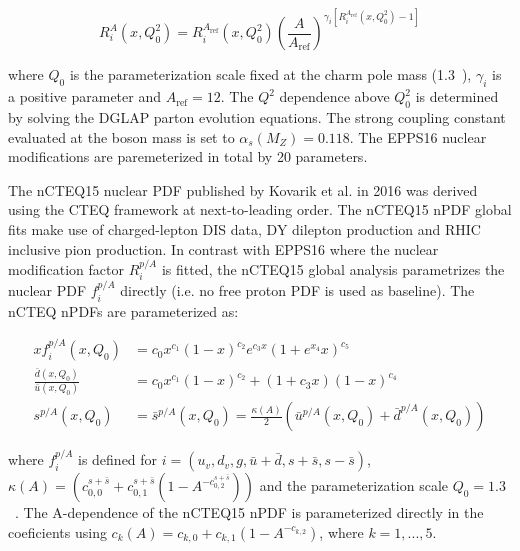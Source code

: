 \begin{equation}
  R^{A}_{i}\left(x,Q^{2}_{0}\right) = R^{A_{\mathrm{ref}}}_{i}\left(x,Q^{2}_{0}\right)\left(\frac{A}{A_{\mathrm{ref}}}\right)^{\gamma_{i}\left[R_{i}^{A_{\mathrm{ref}}}\left(x,Q^{2}_{0}\right) - 1\right]}
\end{equation}

where $Q_{0}$ is the parameterization scale fixed at the charm pole mass (1.3~\GeV), $\gamma_{i}$ is a positive parameter and $A_{\mathrm{ref}}=12$. The $Q^{2}$ dependence above $Q^{2}_{0}$ is determined by solving the DGLAP parton evolution equations. The strong coupling constant evaluated at the {\PZ} boson mass is set to $\alpha_{s}\left(M_{Z}\right)=0.118$. The EPPS16 nuclear modifications are paremeterized in total by 20 parameters.

The nCTEQ15 nuclear PDF published by Kovarik et al. in 2016 was derived using the CTEQ framework at next-to-leading order. The nCTEQ15 nPDF global fits make use of charged-lepton DIS data, DY dilepton production and RHIC inclusive pion production. In contrast with EPPS16 where the nuclear modification factor $R_{i}^{p/A}$ is fitted, the nCTEQ15 global analysis parametrizes  the nuclear PDF $f_{i}^{p/A}$ directly (i.e. no free proton PDF is used as baseline). The nCTEQ nPDFs are parameterized as:

\begin{equation}
  \begin{alignedat}{1}
    xf_{i}^{p/A}\left(x,Q_{0}\right) &= c_{0}x^{c_{1}}\left(1-x\right)^{c_{2}}e^{c_{3}x}\left(1+e^{x_{4}}x\right)^{c_{5}} \\
    \frac{\bar{d}\left(x,Q_{0}\right)}{\bar{u}\left(x,Q_{0}\right)} &= c_{0}x^{c_{1}}\left(1-x\right)^{c_{2}} + \left(1+c_{3}x\right)\left(1-x\right)^{c_{4}} \\
    s^{p/A}\left(x,Q_{0}\right) &= \bar{s}^{p/A}\left(x,Q_{0}\right) = \frac{\kappa\left(A\right)}{2}\left(\bar{u}^{p/A}\left(x,Q_{0}\right) + \bar{d}^{p/A}\left(x,Q_{0}\right)\right)
  \end{alignedat}
\end{equation}

where $f_{i}^{p/A}$ is defined for $i = \left(u_{v} , d_{v} , g , \bar{u}+\bar{d} , s+\bar{s} , s-\bar{s}\right)$, $\kappa\left(A\right)=\left(c^{s+\bar{s}}_{0,0} + c^{s+\bar{s}}_{0,1}\left(1-A^{-c^{s+\bar{s}}_{0,2}}\right)\right)$ and the parameterization scale $Q_{0}=1.3$~\GeV. The A-dependence of the nCTEQ15 nPDF is parameterized directly in the coeficients using $c_{k}\left(A\right) = c_{k,0} + c_{k,1}\left(1-A^{-c_{k,2}}\right)$, where $k=1,...,5$.


